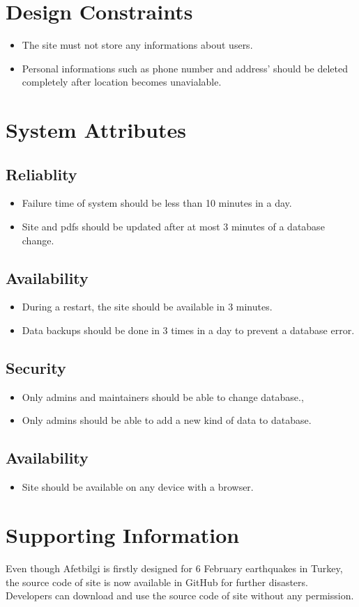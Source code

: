 \section{Design Constraints}
\begin{itemize}
    \item The site must not store any informations about users.
    \item Personal informations such as phone number and address' should be deleted completely after location becomes unavialable.
\end{itemize}

\section{System Attributes}
\subsection{Reliablity}
\begin{itemize}
    \item Failure time of system should be less than 10 minutes in a day.
    \item Site and pdfs should be updated after at most 3 minutes of a database change.
\end{itemize}

\subsection{Availability}
\begin{itemize}
    \item During a restart, the site should be available in 3 minutes.
    \item Data backups should be done in 3 times in a day to prevent a database error.
\end{itemize}

\subsection{Security}
\begin{itemize}
    \item Only admins and maintainers should be able to change database.,
    \item Only admins should be able to add a new kind of data to database.
\end{itemize}

\subsection{Availability}
\begin{itemize}
    \item Site should be available on any device with a browser.
\end{itemize}


\section{Supporting Information}
Even though Afetbilgi is firstly designed for 6 February earthquakes in Turkey, the source code of site is now available in GitHub for further disasters. Developers can download and use the source code of site without any permission.

